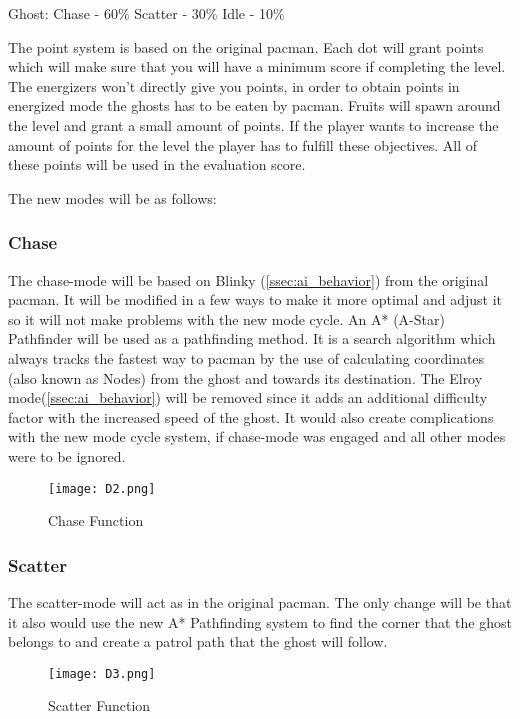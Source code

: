 \begin{center}
Ghost:
Chase - 60\%
Scatter - 30\%
Idle - 10\%
\end{center}


The point system is based on the original pacman. Each dot will grant points which will make sure that you will have a minimum score if completing the level. The energizers won’t directly give you points, in order to obtain points in energized mode the ghosts has to be eaten by pacman. Fruits will spawn around the level and grant a small amount of points. If the player wants to increase the amount of points for the level the player has to fulfill these objectives. All of these points will be used in the evaluation score.


The new modes will be as follows:

\subsubsection{Chase}
The chase-mode will be based on Blinky (\ref{ssec:ai_behavior}) from the original pacman. It will be modified in a few ways to make it more optimal and adjust it so it will not make problems with the new mode cycle. An A* (A-Star) Pathfinder will be used as a pathfinding method. It is a search algorithm which always tracks the fastest way to pacman by the use of calculating coordinates (also known as Nodes) from the ghost and towards its destination. The Elroy mode(\ref{ssec:ai_behavior}) will be removed since it adds an additional difficulty factor with the increased speed of the ghost. It would also create complications with the new mode cycle system, if chase-mode was engaged and all other modes were to be ignored.


\begin{figure}[!htbp]
\centering
\texttt{[image: D2.png]}
\caption{ Chase Function }
\label{fig:Chase}
\end{figure}


\subsubsection{Scatter}
The scatter-mode will act as in the original pacman. The only change will be that it also would use the new A* Pathfinding system to find the corner that the ghost belongs to and create a patrol path that the ghost will follow.


\begin{figure}[!htbp]
\centering
\texttt{[image: D3.png]}
\caption{ Scatter Function }
\label{fig:Scatter}
\end{figure}


